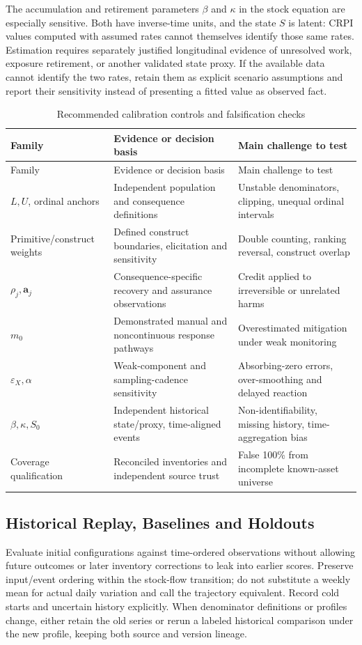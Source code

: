 \documentclass[11pt]{article}
\begin{document}
The accumulation and retirement parameters $\beta$ and
$\kappa$ in the stock equation are especially sensitive.
Both have inverse-time units, and the state $S$ is latent:
CRPI values computed with assumed rates cannot themselves
identify those same rates. Estimation requires separately
justified longitudinal evidence of unresolved work,
exposure retirement, or another validated state proxy.
If the available data cannot identify the two rates,
retain them as explicit scenario assumptions and
report their sensitivity instead of presenting a fitted
value as observed fact.

\begingroup
\small
\begin{longtable}{P{0.20\textwidth} P{0.32\textwidth} P{0.37\textwidth}}
\caption{Recommended calibration controls and falsification checks}
\label{tab:operational-calibration}\\
\toprule
Family & Evidence or decision basis & Main challenge to test \\
\midrule
\endfirsthead
\toprule
Family & Evidence or decision basis & Main challenge to test \\
\midrule
\endhead
$L,U$, ordinal anchors & Independent population and consequence definitions & Unstable denominators, clipping, unequal ordinal intervals \\
Primitive/construct weights & Defined construct boundaries, elicitation and sensitivity & Double counting, ranking reversal, construct overlap \\
$\rho_j,\mathbf{a}_j$ & Consequence-specific recovery and assurance observations & Credit applied to irreversible or unrelated harms \\
$m_0$ & Demonstrated manual and noncontinuous response pathways & Overestimated mitigation under weak monitoring \\
$\varepsilon_X,\alpha$ & Weak-component and sampling-cadence sensitivity & Absorbing-zero errors, over-smoothing and delayed reaction \\
$\beta,\kappa,S_0$ & Independent historical state/proxy, time-aligned events & Non-identifiability, missing history, time-aggregation bias \\
Coverage qualification & Reconciled inventories and independent source trust & False 100\% from incomplete known-asset universe \\
\bottomrule
\end{longtable}
\endgroup

\subsection{Historical Replay, Baselines and Holdouts}
Evaluate initial configurations against time-ordered observations
without allowing future outcomes or later inventory corrections
to leak into earlier scores. Preserve input/event ordering
within the stock-flow transition; do not substitute a
weekly mean for actual daily variation and call the
trajectory equivalent. Record cold starts and uncertain
history explicitly. When denominator definitions or
profiles change, either retain the old series or rerun
a labeled historical comparison under the new
profile, keeping both source and version lineage.
\end{document}
